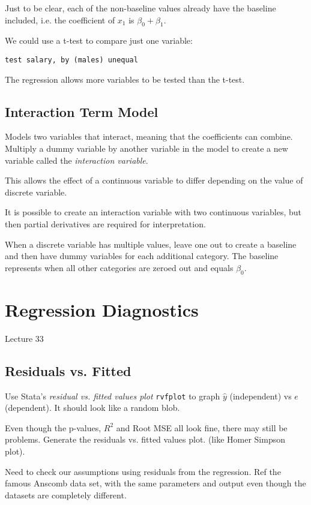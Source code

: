 \documentclass[11pt, oneside]{article}   	%
\begin{document}
Just to be clear, each of the non-baseline values already have the baseline included, i.e. the coefficient of $x_1$ is $\beta_0 + \beta_1$.

We could use a t-test to compare just one variable:
\begin{verbatim}
test salary, by (males) unequal
\end{verbatim}

The regression allows more variables to be tested than the t-test.

\subsection{Interaction Term Model}

Models two variables that interact, meaning that the coefficients can combine. Multiply a dummy variable by another variable in the model to create a new variable called the \textit{interaction variable}.

This allows the effect of a continuous variable to differ depending on the value of discrete variable.

It is possible to create an interaction variable with two continuous variables, but then partial derivatives are required for interpretation.

When a discrete variable has multiple values, leave one out to create a baseline and then have dummy variables for each additional category. The baseline represents when all other categories are zeroed out and equals $\beta_0$. 

\section{Regression Diagnostics}

Lecture 33

\subsection{Residuals vs. Fitted}

Use Stata's \textit{residual vs. fitted values plot} \texttt{rvfplot} to graph $\hat{y}$ (independent) vs $e$ (dependent). It should look like a random blob.

Even though the p-values, $R^2$ and Root MSE all look fine, there may still be problems. Generate the residuals vs. fitted values plot. (like Homer Simpson plot).

Need to check our assumptions using residuals from the regression. Ref the famous Anscomb data set, with the same parameters and output even though the datasets are completely different.
\end{document}
